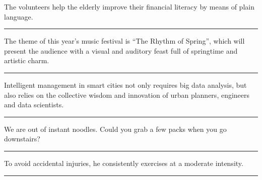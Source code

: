 \documentclass[11pt,a4paper]{article}
\newcommand{\num}[1]{\makebox[1.9em][r]{#1.}\hspace{0.3em}}
\newcommand{\wline}{\noindent\rule{\linewidth}{0.4pt}}
\begin{document}
\begin{minipage}{\linewidth}

\num{14}The volunteers help the elderly improve their financial literacy by means of plain language.

\vspace{0.25em}

\wline

\end{minipage}

\begin{minipage}{\linewidth}

\num{15}The theme of this year’s music festival is “The Rhythm of Spring”, which will present the audience with a visual and auditory feast full of springtime and artistic charm.

\vspace{0.25em}

\wline

\end{minipage}

\begin{minipage}{\linewidth}

\num{16}Intelligent management in smart cities not only requires big data analysis, but also relies on the collective wisdom and innovation of urban planners, engineers and data scientists.

\vspace{0.25em}

\wline

\end{minipage}

\vspace{0.35em}\vspace{0.15em}

\begin{minipage}{\linewidth}

\num{17}We are out of instant noodles. Could you grab a few packs when you go downstairs?

\vspace{0.25em}

\wline

\end{minipage}

\begin{minipage}{\linewidth}

\num{18}To avoid accidental injuries, he consistently exercises at a moderate intensity.

\vspace{0.25em}

\wline

\end{minipage}
\end{document}
